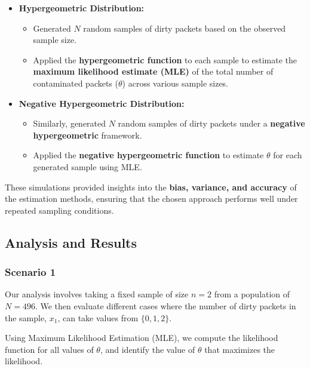 \documentclass[
  14pt,
]{article}
\providecommand{\tightlist}{%
  \setlength{\itemsep}{0pt}\setlength{\parskip}{0pt}}
\begin{document}
\begin{itemize}
\tightlist
\item
  \textbf{Hypergeometric Distribution:}

  \begin{itemize}
  \tightlist
  \item
    Generated \textbf{\(N\)} random samples of dirty packets based on
    the observed sample size.\\
  \item
    Applied the \textbf{hypergeometric function} to each sample to
    estimate the \textbf{maximum likelihood estimate (MLE)} of the total
    number of contaminated packets (\(\theta\)) across various sample
    sizes.
  \end{itemize}
\item
  \textbf{Negative Hypergeometric Distribution:}

  \begin{itemize}
  \tightlist
  \item
    Similarly, generated \textbf{\(N\)} random samples of dirty packets
    under a \textbf{negative hypergeometric} framework.\\
  \item
    Applied the \textbf{negative hypergeometric function} to estimate
    \(\theta\) for each generated sample using MLE.
  \end{itemize}
\end{itemize}

These simulations provided insights into the \textbf{bias, variance, and
accuracy} of the estimation methods, ensuring that the chosen approach
performs well under repeated sampling conditions.

\subsection{\texorpdfstring{\textbf{Analysis and Results
}}{Analysis and Results }}\label{analysis-and-results}

\subsubsection{Scenario 1}\label{scenario-1}

Our analysis involves taking a fixed sample of size \(n = 2\) from a
population of \(N = 496\). We then evaluate different cases where the
number of dirty packets in the sample, \(x_1\), can take values from
\(\{0,1,2\}\).

Using Maximum Likelihood Estimation (MLE), we compute the likelihood
function for all values of \(\theta\), and identify the value of
\(\theta\) that maximizes the likelihood.
\end{document}

